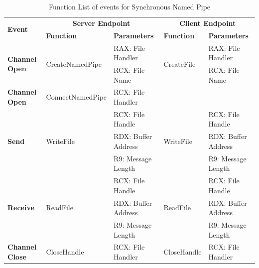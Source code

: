     \begin{table}[H]
        \centering
        \caption{Function List  of events for Synchronous Named Pipe}
        \label{synfunctions}
        \begin{tabular}{|l|l|l|l|l|}
            \hline
             \multirow{2}{*}{\textbf{Event}} &
               \multicolumn{2}{c|}{\textbf{Server Endpoint}} &
               \multicolumn{2}{c|}{\textbf{Client Endpoint}} \\
             \cline{2-5}
              & \textbf{Function}& \textbf{Parameters} & \textbf{Function} & \textbf{Parameters}  \\
             \hline
             \multirow{2}{*}{{\textbf{Channel Open}}}
             &\multirow{2}{*}{{CreateNamedPipe}} &  RAX: File Handler & \multirow{2}{*}{CreateFile} &  RAX: File Handler\\
              \cline{3-3} \cline{5-5}
             &&  RCX: File Name &  &  RCX: File Name\\
            \hline
             {{\textbf{Channel Open}}}
             &{ConnectNamedPipe} & {RCX: File Handler} & & \\
            \hline
             \multirow{3}{*}{{\textbf{Send}}}
             &\multirow{3}{*}{WriteFile} &  RCX: File Handle & \multirow{3}{*}{WriteFile} &  RCX: File Handle\\
              \cline{3-3} \cline{5-5}
             &&  RDX: Buffer Address &  &  RDX: Buffer Address\\
                           \cline{3-3} \cline{5-5}
             & &  R9: Message Length &  &  R9: Message Length\\
            \hline
             \multirow{3}{*}{{\textbf{Receive}}}
             & \multirow{3}{*}{ReadFile}&  RCX: File Handle & \multirow{3}{*}{ReadFile} &  RCX: File Handle\\
              \cline{3-3} \cline{5-5}
              &&  RDX: Buffer Address &  &  RDX: Buffer Address\\
                           \cline{3-3} \cline{5-5}
             & &  R9: Message Length &  &  R9: Message Length\\
            \hline
           {{\textbf{Channel Close}}}
             &{CloseHandle} & {RCX: File Handler} & {CloseHandle} & {RCX: File Handler}\\
            \hline
        \end{tabular}
    \end{table}

